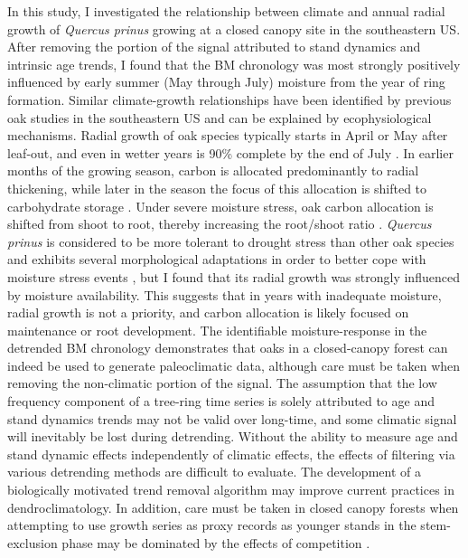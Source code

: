 In this study,  I  investigated the relationship between climate and annual radial growth of \textit{Quercus prinus} growing at a closed canopy site in the southeastern US. After removing the portion of the signal attributed to stand dynamics and intrinsic age trends,  I  found that the BM chronology was most strongly positively influenced by early summer (May through July) moisture from the year of ring formation. Similar climate-growth relationships have been identified by previous oak studies in the southeastern US \cite{speer2009climate, li2011dendroclimatic} and can be explained by ecophysiological mechanisms. 
Radial growth of oak species typically starts in April or May after leaf-out, and even in wetter years is 90\% complete by the end of July \cite{robertson1992factors}. In earlier months of the growing season, carbon is allocated predominantly to radial thickening, while later in the season the focus of this allocation is shifted to carbohydrate storage \cite{zweifel2006intra}. Under severe moisture stress, oak carbon allocation is shifted from shoot to root, thereby increasing the root/shoot ratio \cite{dickson1996oak}. \textit{Quercus prinus} is considered to be more tolerant to drought stress than other oak species and exhibits several morphological adaptations in order to better cope with moisture stress events \cite{dickson1996oak}, but  I  found that its radial growth was strongly influenced by moisture availability. This suggests that in years with inadequate moisture, radial growth is not a priority, and carbon allocation is likely focused on maintenance or root development. The identifiable moisture-response in the detrended BM chronology demonstrates that oaks in a closed-canopy forest can indeed be used to generate paleoclimatic data, although care must be taken when removing the non-climatic portion of the signal. The assumption that the low frequency component of a tree-ring time series is solely attributed to age and stand dynamics trends may not be valid over long-time, and some climatic signal will inevitably be lost during detrending. Without the ability to measure age and stand dynamic effects independently of climatic effects, the effects of filtering via various detrending methods are difficult to evaluate. The development of a biologically motivated trend removal algorithm may improve current practices in dendroclimatology. In addition, care must be taken in closed canopy forests when attempting to use growth series as proxy records as younger stands in the stem-exclusion phase may be dominated by the effects of competition \cite{oliver1980forest}. 

